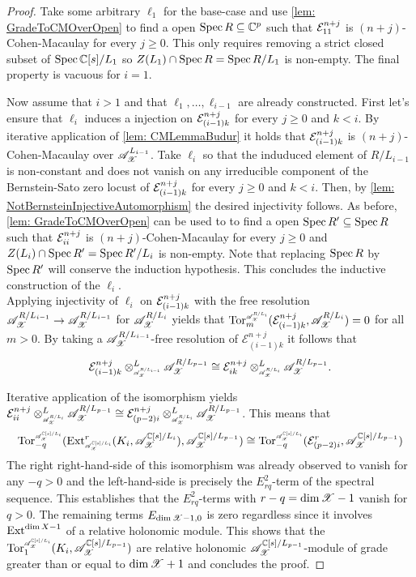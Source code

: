\begin{proof}
  Take some arbitrary $\ell_1$ for the base-case and use \cref{lem: GradeToCMOverOpen} to find a open $\operatorname{Spec} R \subseteq \mathbb{C}^p$ such that $\mathcal{E}^{n+j}_{11}$  is $(n+j)$-Cohen-Macaulay for every $j\geq 0$.
  This only requires removing a strict closed subset of $\operatorname{Spec} \mathbb{C}[s]/L_1$ so $Z(L_1)\cap \operatorname{Spec} R = \operatorname{Spec} R/L_1$ is non-empty.
  The final property is vacuous for $i=1$.

  Now assume that $i>1$ and that $\ell_1,\ldots, \ell_{i-1}$ are already constructed.
  First let's ensure that $\ell_i$
  induces a injection on $\mathcal{E}^{n+j}_{(i-1)k}$ for every $j\geq 0$ and $k<i$.
  By iterative application of \cref{lem: CMLemmaBudur} it holds that $\mathcal{E}^{n+j}_{(i-1)k }$
  is $(n+j)$-Cohen-Macaulay over $\mathscr{A}_{\mathscr{X}}^{L_{i-1}}$.
  Take $\ell_i$ so that the induduced element of $R/L_{i-1}$ is non-constant and does not vanish on any irreducible component of the Bernstein-Sato zero locust of $\mathcal{E}^{n+j}_{(i-1)k}$ for every $j\geq 0$ and $k<i$.
  Then, by \cref{lem: NotBernsteinInjectiveAutomorphism} the desired injectivity follows.
  As before, \cref{lem: GradeToCMOverOpen} can be used to to find a open $\operatorname{Spec} R' \subseteq \operatorname{Spec} R$ such that $\mathcal{E}^{n+j}_{ii}$  is $(n+j)$-Cohen-Macaulay for every $j\geq 0$ and  $Z(L_i)\cap \operatorname{Spec} R' = \operatorname{Spec} R'/L_i$ is non-empty.
  Note that replacing $\operatorname{Spec} R$ by $\operatorname{Spec} R'$ will conserve the induction hypothesis.
  This concludes the inductive construction of the $\ell_i$.\\


  Applying injectivity of $\ell_i$ on $\mathcal{E}_{(i-1)k}^{n+j}$ with the free resolution $\mathscr{A}_{\mathscr{X}}^{R/L_{i-1}}\to\mathscr{A}_{\mathscr{X}}^{R/L_{i-1}}$ for $\mathscr{A}_{\mathscr{X}}^{R/L_i}$ yields that $\Tr{\A_\X^{R/L_i}}{m}(\E_{(i-1)k}^{n+j}, \A_\X^{R/L_i}) = 0$ for all $m>0$.
  By taking a $\mathscr{A}_{\mathscr{X}}^{R/L_{i-1}}$-free resolution of $\mathcal{E}_{(i-1)k}^{n+j}$ it follows that
  $$\mathcal{E}_{(i-1)k}^{n+j} \otimes^L_{\scaleto{\A_\X^{R/L_{i-1}}}{8pt}} \A_\X^{R/L_{p-1}} \cong  \mathcal{E}_{ik}^{n+j}  \otimes^L_{\scaleto{\A_\X^{R/L_{i}}}{8pt}}\A_\X^{R/L_{p-1}}. $$


  Iterative application of the isomorphism yields $\E_{ii}^{n+j}\otimes^L_{\scaleto{\A_\X^{R/L_{i}}}{8pt}} \A_\X^{R/L_{p-1}} \cong \E_{(p-2)i}^{n+j}\otimes^L_{\scaleto{\A_\X^{R/L_{i}}}{8pt}} \A_\X^{R/L_{p-1}}$.
  This means that
  $$\Tr{\A_\X^{\C[s]/L_{i}}}{-q} (\Ex{\A_\X^{\C[s]/L_{i}} }{r} (K_i,\A_\X^{\C[s]/L_{i}}), \A_\X^{\C[s]/L_{p-1}})\cong \Tr{\A_\X^{\C[s]/L_{i}} }{-q}(\E_{(p-2)i}^{r}, \A_\X^{\C[s]/L_{p-1}}) $$
  The right right-hand-side of this isomorphism was already observed to vanish for any $-q > 0$ and the left-hand-side is precisely the $E_{rq}^2$-term of the spectral sequence.
  This establishes that the $E_{rq}^2$-terms with $r-q = \dim \mathscr{X} -1$ vanish for $q>0$.
  The remaining terms $E_{\dim \mathscr{X} -1,0}$ is zero regardless since it involves $\operatorname{Ext}^{\dim X - 1}$ of a relative holonomic module.
  This shows that the $\Tr{\A_\X^{\C[s]/L_i}}{1}(K_i, \A_\X^{\C[s]/L_{p-1}})$ are relative holonomic $\mathscr{A}_{\mathscr{X}}^{\mathbb{C}[s]/L_{p-1}}$-module of grade greater than or equal to $\dim \mathscr{X}+1$ and concludes the proof.
  \end{proof}



